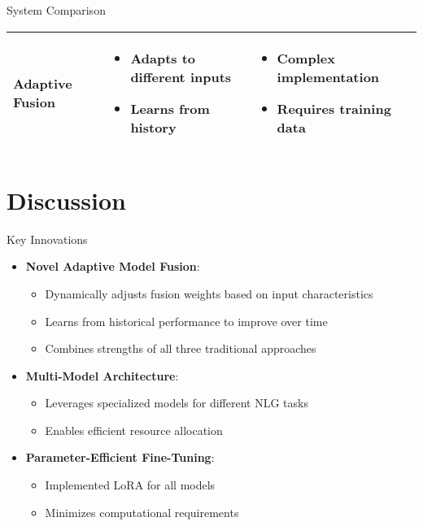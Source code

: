 \documentclass{beamer}
\begin{document}
\begin{frame}{System Comparison}
\begin{table}
\begin{tabular}{@{}p{}p{}p{}@{}}
\midrule
Adaptive Fusion &
\begin{itemize}\setlength{\itemsep}{0pt}\setlength{\parskip}{0pt}\setlength{\parsep}{0pt}
    \item Adapts to different inputs
    \item Learns from history
\end{itemize} &
\begin{itemize}\setlength{\itemsep}{0pt}\setlength{\parskip}{0pt}\setlength{\parsep}{0pt}
    \item Complex implementation
    \item Requires training data
\end{itemize} \\
\bottomrule
\end{tabular}
\end{table}
\end{frame}

\section{Discussion}

\begin{frame}{Key Innovations}
\begin{itemize}
    \item \textbf{Novel Adaptive Model Fusion}:
    \begin{itemize}
        \item Dynamically adjusts fusion weights based on input characteristics
        \item Learns from historical performance to improve over time
        \item Combines strengths of all three traditional approaches
    \end{itemize}
    \item \textbf{Multi-Model Architecture}:
    \begin{itemize}
        \item Leverages specialized models for different NLG tasks
        \item Enables efficient resource allocation
    \end{itemize}
    \item \textbf{Parameter-Efficient Fine-Tuning}:
    \begin{itemize}
        \item Implemented LoRA for all models
        \item Minimizes computational requirements
    \end{itemize}
\end{itemize}
\end{frame}
\end{document}

